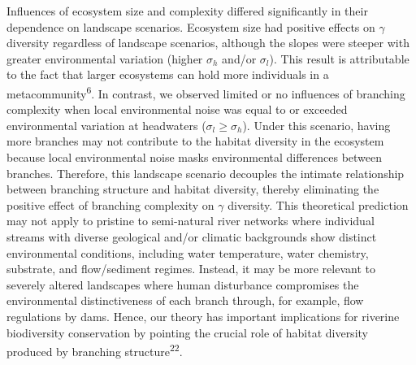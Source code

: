 \documentclass[
]{article}
\begin{document}
Influences of ecosystem size and complexity differed significantly in
their dependence on landscape scenarios. Ecosystem size had positive
effects on \(\gamma\) diversity regardless of landscape scenarios,
although the slopes were steeper with greater environmental variation
(higher \(\sigma_h\) and/or \(\sigma_l\)). This result is attributable
to the fact that larger ecosystems can hold more individuals in a
metacommunity\textsuperscript{6}. In contrast, we observed limited or no
influences of branching complexity when local environmental noise was
equal to or exceeded environmental variation at headwaters
(\(\sigma_l \ge \sigma_h\)). Under this scenario, having more branches
may not contribute to the habitat diversity in the ecosystem because
local environmental noise masks environmental differences between
branches. Therefore, this landscape scenario decouples the intimate
relationship between branching structure and habitat diversity, thereby
eliminating the positive effect of branching complexity on \(\gamma\)
diversity. This theoretical prediction may not apply to pristine to
semi-natural river networks where individual streams with diverse
geological and/or climatic backgrounds show distinct environmental
conditions, including water temperature, water chemistry, substrate, and
flow/sediment regimes. Instead, it may be more relevant to severely
altered landscapes where human disturbance compromises the environmental
distinctiveness of each branch through, for example, flow regulations by
dams. Hence, our theory has important implications for riverine
biodiversity conservation by pointing the crucial role of habitat
diversity produced by branching structure\textsuperscript{22}.
\end{document}

